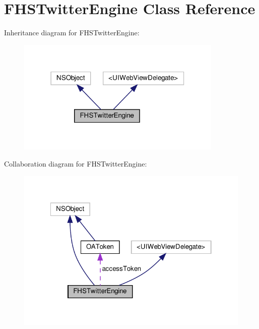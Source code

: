 \hypertarget{interfaceFHSTwitterEngine}{}\section{F\+H\+S\+Twitter\+Engine Class Reference}
\label{interfaceFHSTwitterEngine}


Inheritance diagram for F\+H\+S\+Twitter\+Engine\+:
\nopagebreak
\begin{figure}[H]
\begin{center}
\leavevmode
\includegraphics[width=278pt]{interfaceFHSTwitterEngine__inherit__graph}
\end{center}
\end{figure}


Collaboration diagram for F\+H\+S\+Twitter\+Engine\+:
\nopagebreak
\begin{figure}[H]
\begin{center}
\leavevmode
\includegraphics[width=322pt]{interfaceFHSTwitterEngine__coll__graph}
\end{center}
\end{figure}
